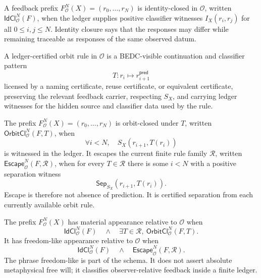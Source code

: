 \begin{definition}
\label{def:philosophy-identity-closure}
A feedback prefix $F^N_{\mathcal O}(X)=(r_0,\ldots,r_N)$ is
identity-closed in $\mathcal O$, written
$\mathsf{IdCl}^N_{\mathcal O}(F)$, when the ledger supplies positive
classifier witnesses $I_X(r_i,r_j)$ for all $0\leq i,j\leq N$.
Identity closure says that the responses may differ while remaining
traceable as responses of the same observed datum.
\end{definition}

\begin{definition}
\label{def:philosophy-ledger-certified-orbit-rule}
A ledger-certified orbit rule in $\mathcal O$ is a BEDC-visible
continuation and classifier pattern
$$
T:r_i\mapsto r^{\mathsf{pred}}_{i+1}
$$
licensed by a naming certificate, reuse certificate, or equivalent
certificate, preserving the relevant feedback carrier, respecting
$S_X$, and carrying ledger witnesses for the hidden source and
classifier data used by the rule.
\end{definition}

\begin{definition}
\label{def:philosophy-orbit-closure-certified-escape}
The prefix $F^N_{\mathcal O}(X)=(r_0,\ldots,r_N)$ is orbit-closed under
$T$, written $\mathsf{OrbitCl}^N_{\mathcal O}(F,T)$, when
$$
\forall i<N,\quad S_X(r_{i+1},T(r_i))
$$
is witnessed in the ledger. It escapes the current finite rule family
$\mathcal R$, written $\mathsf{Escape}^N_{\mathcal O}(F,\mathcal R)$,
when for every $T\in\mathcal R$ there is some $i<N$ with a positive
separation witness
$$
\mathsf{Sep}_{S_X}(r_{i+1},T(r_i)).
$$
Escape is therefore not absence of prediction. It is certified
separation from each currently available orbit rule.
\end{definition}

\begin{definition}
\label{def:philosophy-material-freedomlike-appearance}
The prefix $F^N_{\mathcal O}(X)$ has material appearance relative to
$\mathcal O$ when
$$
\mathsf{IdCl}^N_{\mathcal O}(F)
\quad\wedge\quad
\exists T\in\mathcal R,\ \mathsf{OrbitCl}^N_{\mathcal O}(F,T).
$$
It has freedom-like appearance relative to $\mathcal O$ when
$$
\mathsf{IdCl}^N_{\mathcal O}(F)
\quad\wedge\quad
\mathsf{Escape}^N_{\mathcal O}(F,\mathcal R).
$$
The phrase freedom-like is part of the schema. It does not assert
absolute metaphysical free will; it classifies observer-relative
feedback inside a finite ledger.
\end{definition}

